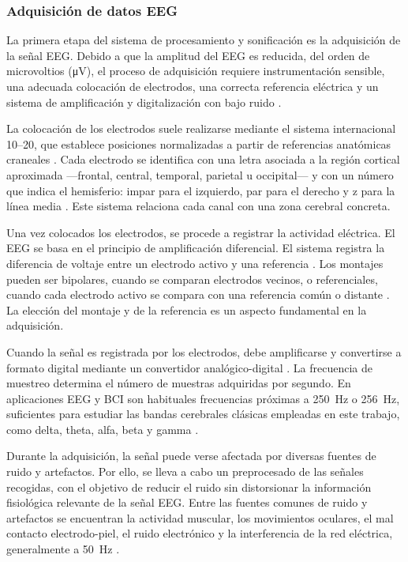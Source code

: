 \documentclass[../main.tex]{subfiles}
\begin{document}
\subsubsection{Adquisición de datos EEG}

La primera etapa del sistema de procesamiento y sonificación es la adquisición de la señal EEG. Debido a que la amplitud del EEG es reducida, del orden de microvoltios (\si{\micro\volt}), el proceso de adquisición requiere instrumentación sensible, una adecuada colocación de electrodos, una correcta referencia eléctrica y un sistema de amplificación y digitalización con bajo ruido \cite{Palaniappan2014,StLouisFrey2016}.

La colocación de los electrodos suele realizarse mediante el sistema internacional 10--20, que establece posiciones normalizadas a partir de referencias anatómicas craneales \cite{StLouisFrey2016}. Cada electrodo se identifica con una letra asociada a la región cortical aproximada ---frontal, central, temporal, parietal u occipital--- y con un número que indica el hemisferio: impar para el izquierdo, par para el derecho y z para la línea media \cite{Palaniappan2014,StLouisFrey2016}. Este sistema relaciona cada canal con una zona cerebral concreta.

Una vez colocados los electrodos, se procede a registrar la actividad eléctrica. El EEG se basa en el principio de amplificación diferencial. El sistema registra la diferencia de voltaje entre un electrodo activo y una referencia \cite{StLouisFrey2016}. Los montajes pueden ser bipolares, cuando se comparan electrodos vecinos, o referenciales, cuando cada electrodo activo se compara con una referencia común o distante \cite{Palaniappan2014,StLouisFrey2016}. La elección del montaje y de la referencia es un aspecto fundamental en la adquisición.

Cuando la señal es registrada por los electrodos, debe amplificarse y convertirse a formato digital mediante un convertidor analógico-digital \cite{Palaniappan2014}. La frecuencia de muestreo determina el número de muestras adquiridas por segundo. En aplicaciones EEG y BCI son habituales frecuencias próximas a \SI{250}{\hertz} o \SI{256}{\hertz}, suficientes para estudiar las bandas cerebrales clásicas empleadas en este trabajo, como delta, theta, alfa, beta y gamma \cite{Palaniappan2014,Wu2010}.

Durante la adquisición, la señal puede verse afectada por diversas fuentes de ruido y artefactos. Por ello, se lleva a cabo un preprocesado de las señales recogidas, con el objetivo de reducir el ruido sin distorsionar la información fisiológica relevante de la señal EEG. Entre las fuentes comunes de ruido y artefactos se encuentran la actividad muscular, los movimientos oculares, el mal contacto electrodo-piel, el ruido electrónico y la interferencia de la red eléctrica, generalmente a \SI{50}{\hertz} \cite{Palaniappan2014}.
\end{document}

